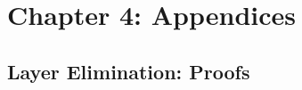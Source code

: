 
\chapter{Chapter 4: Appendices}\label{app:chapter-four}

\section{Layer Elimination: Proofs}\label{app:layer-elimination}


